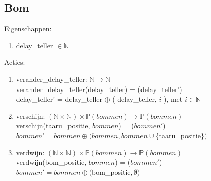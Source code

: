 \subsection{Bom}\label{sec:bom} %
Eigenschappen:
\begin{enumerate}
 \item delay\_teller $\in \mathbb{N}$
\end{enumerate}
Acties:
\begin{enumerate}
 \item verander\_delay\_teller: $\mathbb{N} \rightarrow \mathbb{N}$ \\
       verander\_delay\_teller(delay\_teller) = (delay\_teller')  \\
       delay\_teller' = delay\_teller $\oplus$ ( delay\_teller, $i$ ), met $i \in \mathbb{N}$ \\
 \item verschijn: $(\mathbb{N} \times \mathbb{N}) \times \mathbb{P}(bommen) \rightarrow \mathbb{P}(bommen)$ \\
       verschijn(taaru\_positie, $bommen$) = ($bommen'$) \\
       $bommen' = bommen \oplus ( bommen, bommen \cup \{$taaru\_positie$\} )$ \\
 \item verdwijn: $(\mathbb{N} \times \mathbb{N}) \times \mathbb{P}(bommen) \rightarrow \mathbb{P}(bommen)$ \\
       verdwijn(bom\_positie, $bommen$) = ($bommen'$) \\
       $bommen' = bommen \oplus ( $bom\_positie$, \emptyset )$ \\
\end{enumerate}

